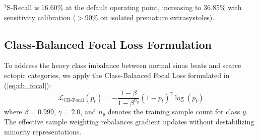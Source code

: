 \documentclass[conference]{IEEEtran}
\renewcommand{\arraystretch}{0.86}
\begin{document}
\begin{table}[t]
\caption{Edge-Oriented Comparative Benchmark Comparison across MIT-BIH DS2 Inter-Patient Test Set (All baselines are standardized PyTorch reproductions trained under identical DS1 splits and optimization hyperparameters; embedded execution profiling is detailed in Table~\ref{tab:layer_profile})}
\label{tab:main_benchmark}
\centering
\renewcommand{\arraystretch}{1.14}
\vspace{1pt}
\raggedright \footnotesize $^\dagger$S-Recall is 16.60\% at the default operating point, increasing to 36.85\% with sensitivity calibration ($>90\%$ on isolated premature extrasystoles).
\vspace{-3pt}
\end{table}


\subsection{Class-Balanced Focal Loss Formulation}
To address the heavy class imbalance between normal sinus beats and scarce ectopic categories, we apply the Class-Balanced Focal Loss \cite{cui2019class} formulated in (\ref{eq:cb_focal}):
\begin{equation}
\mathcal{L}_{\text{CB-Focal}}(p_t) = -\frac{1 - \beta}{1 - \beta^{n_y}} (1 - p_t)^\gamma \log(p_t)
\label{eq:cb_focal}
\end{equation}
where $\beta = 0.999$, $\gamma = 2.0$, and $n_y$ denotes the training sample count for class $y$. The effective sample weighting rebalances gradient updates without destabilizing minority representations.
\end{document}
